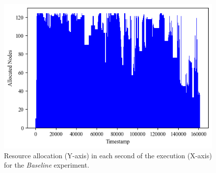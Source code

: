 \documentclass[a4paper,fleqn]{cas-dc}
\begin{document}
\begin{figure}[tbp]
\centering
    \includegraphics[clip, width=0.75\linewidth, trim={0.1cm 0.25cm 0.1cm 0.2cm}]{figures/Baseline.png}
        \caption{
    Resource allocation (Y-axis) in each second of the execution (X-axis) for the \textit{Baseline} experiment.}
    \label{fig:baseline}
\end{figure}%
\end{document}
